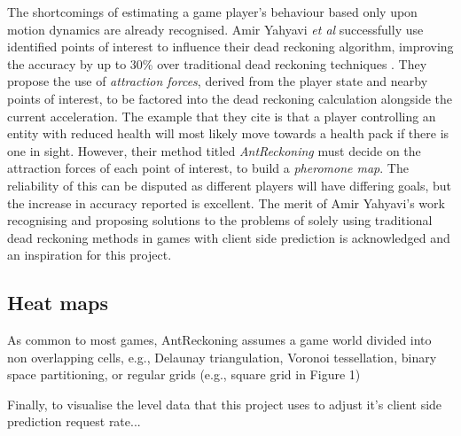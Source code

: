 \documentclass[journal]{IEEEtran}
\begin{document}
The shortcomings of estimating a game player's behaviour based only upon motion dynamics are already recognised. Amir Yahyavi \textit{et al} successfully use identified points of interest to influence their dead reckoning algorithm, improving the accuracy by up to 30\% over traditional dead reckoning techniques \cite{yahyavi2011antreckoning}. They propose the use of \textit{attraction forces}, derived from the player state and nearby points of interest, to be factored into the dead reckoning calculation alongside the current acceleration. The example that they cite is that a player controlling an entity with reduced health will most likely move towards a health pack if there is one in sight. However, their method titled \textit{AntReckoning} must decide on the attraction forces of each point of interest, to build a \textit{pheromone map}. The reliability of this can be disputed as different players will have differing goals, but the increase in accuracy reported is excellent. The merit of Amir Yahyavi's work \cite{yahyavi2011antreckoning} \cite{yahyavi2013interest} \cite{yahyavi2013towards} recognising and proposing solutions to the problems of solely using traditional dead reckoning methods in games with client side prediction is acknowledged and an inspiration for this project.

\cite{yahyavi2013interest}

\cite{yahyavi2013towards}

\cite{cai1999auto}

\cite{jaya2016combining}

\cite{larsson2016movement}

\subsection{Heat maps}

As common to most games, AntReckoning assumes
a game world divided into non overlapping cells,
e.g., Delaunay triangulation, Voronoi tessellation, binary space
partitioning, or regular grids (e.g., square grid in Figure 1)

\cite{bauckhage2014beyond}

\cite{kuipers1978modeling}

\cite{wilkinson2009history}

\cite{moumtzidou2013discovery}

\cite{drachen2013spatial}

Finally, to visualise the level data that this project uses to adjust it's client side prediction request rate...
\end{document}
